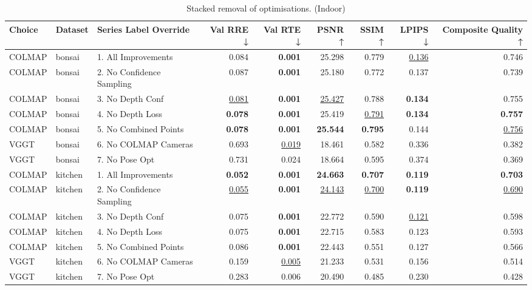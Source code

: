 \begin{table}[H]
\caption{\ifdefined\customcaption \customcaption \else Stacked removal of optimisations. (Indoor) \fi}
\label{tab:99_all_improvements_stacked_indoor}
\centering
\scriptsize
\begin{tabular}{lllrrrrrr}
\toprule
Choice & Dataset & Series Label Override & Val RRE ↓ & Val RTE ↓ & PSNR ↑ & SSIM ↑ & LPIPS ↓ & Composite Quality ↑ \\
\midrule
COLMAP & bonsai & 1. All Improvements & 0.084 & \textbf{0.001} & 25.298 & 0.779 & \underline{0.136} & 0.746 \\
COLMAP & bonsai & 2. No Confidence Sampling & 0.087 & \textbf{0.001} & 25.180 & 0.772 & 0.137 & 0.739 \\
COLMAP & bonsai & 3. No Depth Conf & \underline{0.081} & \textbf{0.001} & \underline{25.427} & 0.788 & \textbf{0.134} & 0.755 \\
COLMAP & bonsai & 4. No Depth Loss & \textbf{0.078} & \textbf{0.001} & 25.419 & \underline{0.791} & \textbf{0.134} & \textbf{0.757} \\
COLMAP & bonsai & 5. No Combined Points & \textbf{0.078} & \textbf{0.001} & \textbf{25.544} & \textbf{0.795} & 0.144 & \underline{0.756} \\
VGGT & bonsai & 6. No COLMAP Cameras & 0.693 & \underline{0.019} & 18.461 & 0.582 & 0.336 & 0.382 \\
VGGT & bonsai & 7. No Pose Opt & 0.731 & 0.024 & 18.664 & 0.595 & 0.374 & 0.369 \\
\midrule
COLMAP & kitchen & 1. All Improvements & \textbf{0.052} & \textbf{0.001} & \textbf{24.663} & \textbf{0.707} & \textbf{0.119} & \textbf{0.703} \\
COLMAP & kitchen & 2. No Confidence Sampling & \underline{0.055} & \textbf{0.001} & \underline{24.143} & \underline{0.700} & \textbf{0.119} & \underline{0.690} \\
COLMAP & kitchen & 3. No Depth Conf & 0.075 & \textbf{0.001} & 22.772 & 0.590 & \underline{0.121} & 0.598 \\
COLMAP & kitchen & 4. No Depth Loss & 0.075 & \textbf{0.001} & 22.715 & 0.583 & 0.123 & 0.593 \\
COLMAP & kitchen & 5. No Combined Points & 0.086 & \textbf{0.001} & 22.443 & 0.551 & 0.127 & 0.566 \\
VGGT & kitchen & 6. No COLMAP Cameras & 0.159 & \underline{0.005} & 21.233 & 0.531 & 0.156 & 0.514 \\
VGGT & kitchen & 7. No Pose Opt & 0.283 & 0.006 & 20.490 & 0.485 & 0.230 & 0.428 \\

\end{tabular}
\end{table}
